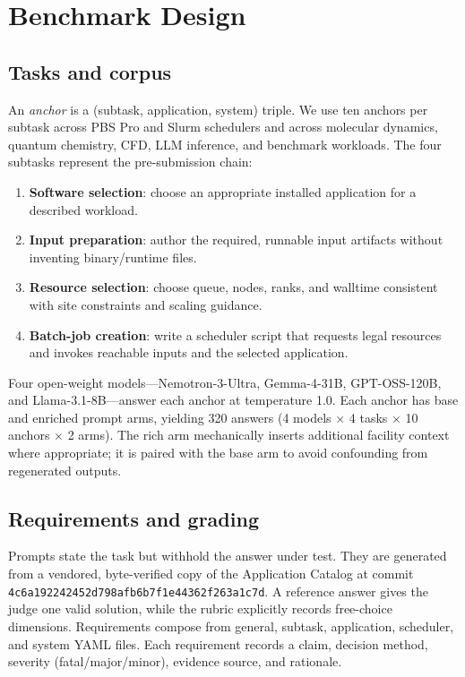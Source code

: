 \documentclass[conference]{IEEEtran}
\begin{document}
\section{Benchmark Design}
\label{sec:benchmark}
\subsection{Tasks and corpus}
An \emph{anchor} is a (subtask, application, system) triple. We use ten anchors per subtask across PBS Pro and Slurm schedulers and across molecular dynamics, quantum chemistry, CFD, LLM inference, and benchmark workloads. The four subtasks represent the pre-submission chain:
\begin{enumerate}
  \item \textbf{Software selection}: choose an appropriate installed application for a described workload.
  \item \textbf{Input preparation}: author the required, runnable input artifacts without inventing binary/runtime files.
  \item \textbf{Resource selection}: choose queue, nodes, ranks, and walltime consistent with site constraints and scaling guidance.
  \item \textbf{Batch-job creation}: write a scheduler script that requests legal resources and invokes reachable inputs and the selected application.
\end{enumerate}

Four open-weight models---Nemotron-3-Ultra, Gemma-4-31B, GPT-OSS-120B, and Llama-3.1-8B---answer each anchor at temperature 1.0. Each anchor has base and enriched prompt arms, yielding 320 answers (4 models $\times$ 4 tasks $\times$ 10 anchors $\times$ 2 arms). The rich arm mechanically inserts additional facility context where appropriate; it is paired with the base arm to avoid confounding from regenerated outputs.

\subsection{Requirements and grading}
Prompts state the task but withhold the answer under test. They are generated from a vendored, byte-verified copy of the Application Catalog at commit \texttt{4c6a192242452d798afb6b7f1e44362f263a1c7d}. A reference answer gives the judge one valid solution, while the rubric explicitly records free-choice dimensions. Requirements compose from general, subtask, application, scheduler, and system YAML files. Each requirement records a claim, decision method, severity (fatal/major/minor), evidence source, and rationale.
\end{document}
